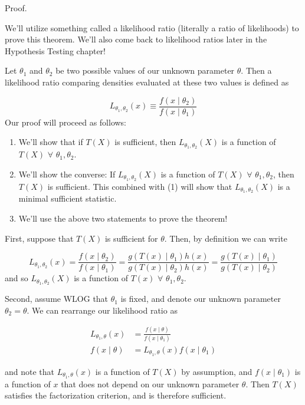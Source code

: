 \documentclass[
  letterpaper,
  DIV=11,
  numbers=noendperiod]{scrreprt}
\begin{document}
Proof.

We'll utilize something called a likelihood ratio (literally a ratio of
likelihoods) to prove this theorem. We'll also come back to likelihood
ratios later in the Hypothesis Testing chapter!

Let \(\theta_1\) and \(\theta_2\) be two possible values of our unknown
parameter \(\theta\). Then a likelihood ratio comparing densities
evaluated at these two values is defined as

\[
L_{\theta_1, \theta_2}(x) \equiv \frac{f(x \mid \theta_2)}{f(x \mid \theta_1)}
\] Our proof will proceed as follows:

\begin{enumerate}
\def\labelenumi{\arabic{enumi}.}
\item
  We'll show that if \(T(X)\) is sufficient, then
  \(L_{\theta_1, \theta_2}(X)\) is a function of \(T(X)\) \(\forall\)
  \(\theta_1, \theta_2\).
\item
  We'll show the converse: If \(L_{\theta_1, \theta_2}(X)\) is a
  function of \(T(X)\) \(\forall\) \(\theta_1, \theta_2\), then \(T(X)\)
  is sufficient. This combined with (1) will show that
  \(L_{\theta_1, \theta_2}(X)\) is a minimal sufficient statistic.
\item
  We'll use the above two statements to prove the theorem!
\end{enumerate}

First, suppose that \(T(X)\) is sufficient for \(\theta\). Then, by
definition we can write

\[
L_{\theta_1, \theta_2}(x) = \frac{f(x \mid \theta_2)}{f(x \mid \theta_1)} = \frac{g(T(x) \mid \theta_1)h(x)}{g(T(x) \mid \theta_2)h(x)} = \frac{g(T(x) \mid \theta_1)}{g(T(x) \mid \theta_2)}
\] and so \(L_{\theta_1, \theta_2}(X)\) is a function of \(T(x)\)
\(\forall\) \(\theta_1, \theta_2\).

Second, assume WLOG that \(\theta_1\) is fixed, and denote our unknown
parameter \(\theta_2 = \theta\). We can rearrange our likelihood ratio
as

\begin{align*}
    L_{\theta_1, \theta}(x) & = \frac{f(x \mid \theta)}{f(x \mid \theta_1)} \\
    f(x \mid \theta) & = L_{\theta_1, \theta}(x) f(x \mid \theta_1) 
\end{align*}

and note that \(L_{\theta_1, \theta}(x)\) is a function of \(T(X)\) by
assumption, and \(f(x \mid \theta_1)\) is a function of \(x\) that does
not depend on our unknown parameter \(\theta\). Then \(T(X)\) satisfies
the factorization criterion, and is therefore sufficient.
\end{document}
